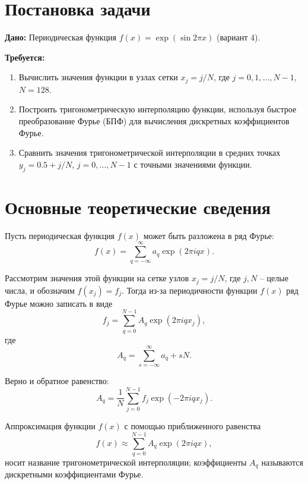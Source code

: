 \documentclass[a4paper, 14pt]{extarticle}
\begin{document}


\renewcommand{\ttdefault}{pcr}

\setlength{\tabcolsep}{3pt}



\newpage
\setcounter{page}{2}

\section{Постановка задачи}

\textbf{Дано:} Периодическая функция \( f(x) = \exp(\sin 2\pi x) \) (вариант 4). 

\textbf{Требуется:}
\begin{enumerate}
    \item Вычислить значения функции в узлах сетки \( x_j = j/N \), где \( j = 0, 1, \ldots, N-1 \), \( N = 128 \).
    \item Построить тригонометрическую интерполяцию функции, используя быстрое преобразование Фурье (БПФ) для вычисления дискретных коэффициентов Фурье.
    \item Сравнить значения тригонометрической интерполяции в средних точках \( y_j = 0.5 + j/N \), \( j = 0, \ldots, N-1 \) с точными значениями функции.
\end{enumerate}

\section{Основные теоретические сведения}

Пусть периодическая функция \( f(x) \) может быть разложена в ряд Фурье:
\[
f(x) = \sum_{q=-\infty}^{\infty} a_q \exp(2\pi i q x).
\]

Рассмотрим значения этой функции на сетке узлов \( x_j = j/N \), где \( j, N \) – целые числа, и обозначим \( f(x_j) = f_j \). Тогда из-за периодичности функции \( f(x) \) ряд Фурье можно записать в виде
\[
f_j = \sum_{q=0}^{N-1} A_q \exp(2\pi i q x_j),
\]
где
\[
A_q = \sum_{s=-\infty}^{\infty} a_q + sN.
\]

Верно и обратное равенство:
\[
A_q = \frac{1}{N} \sum_{j=0}^{N-1} f_j \exp(-2\pi i q x_j).
\]

Аппроксимация функции \( f(x) \) с помощью приближенного равенства
\[
f(x) \approx \sum_{q=0}^{N-1} A_q \exp(2\pi i q x),
\]
носит название тригонометрической интерполяции; коэффициенты \( A_q \) называются дискретными коэффициентами Фурье.
\end{document}
